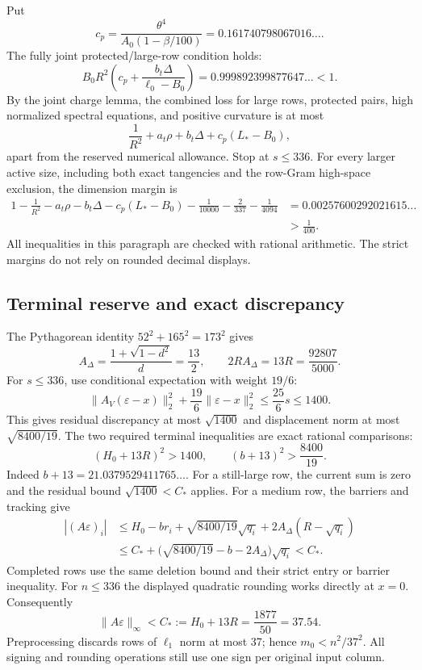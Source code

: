 \documentclass[11pt]{amsart}
\theoremstyle{remark}\newtheorem{remark}[theorem]{Remark}
\begin{document}
Put
\[
 c_p=\frac{\theta^4}{A_0(1-\beta/100)}
     =0.161740798067016\ldots.
\]
The fully joint protected/large-row condition holds:
\[
 B_0R^2\left(c_p+\frac{b_t\Delta}{\ell_0-B_0}\right)
 =0.999892399877647\ldots<1.
\]
By the joint charge lemma, the combined loss for large rows, protected
pairs, high normalized spectral equations, and positive curvature is at
most
\[
 \frac1{R^2}+a_t\rho+b_t\Delta+c_p(L_*-B_0),
\]
apart from the reserved numerical allowance.  Stop at $s\le336$.
For every larger active size, including both exact tangencies and the
row-Gram high-space exclusion, the dimension margin is
\begin{align*}
 1-\frac1{R^2}-a_t\rho-b_t\Delta-c_p(L_*-B_0)
 -\frac1{10000}-\frac2{337}-\frac1{4094}
 &=0.00257600292021615\ldots\\
 &>\frac1{400}.
\end{align*}
All inequalities in this paragraph are checked with rational arithmetic.
The strict margins do not rely on rounded decimal displays.

\subsection{Terminal reserve and exact discrepancy}
The Pythagorean identity $52^2+165^2=173^2$ gives
\[
 A_\Delta=\frac{1+\sqrt{1-d^2}}d=\frac{13}{2},\qquad
 2RA_\Delta=13R=\frac{92807}{5000}.
\]
For $s\le336$, use conditional expectation with weight $19/6$:
\[
 \|A_V(\varepsilon-x)\|_2^2
 +\frac{19}{6}\|\varepsilon-x\|_2^2
 \le\frac{25}{6}s\le1400.
\]
This gives residual discrepancy at most $\sqrt{1400}$ and displacement
norm at most $\sqrt{8400/19}$.  The two required terminal inequalities are
exact rational comparisons:
\[
 \left(H_0+13R\right)^2>1400,\qquad
 (b+13)^2>\frac{8400}{19}.
\]
Indeed $b+13=21.0379529411765\ldots$.  For a still-large row, the current sum is zero and the residual bound
$\sqrt{1400}<C_*$ applies. For a medium row, the barriers and tracking give
\begin{align*}
 |(A\varepsilon)_i|
 &\le H_0-br_i+\sqrt{8400/19}\sqrt{q_i}
             +2A_\Delta(R-\sqrt{q_i})\\
 &\le C_*+
   \bigl(\sqrt{8400/19}-b-2A_\Delta\bigr)\sqrt{q_i}<C_*.
\end{align*}
Completed rows use the same deletion bound and their strict entry or
barrier inequality. For $n\le336$ the displayed quadratic rounding works
directly at $x=0$. Consequently
\[
 \|A\varepsilon\|_\infty<C_*:=H_0+13R
 =\frac{1877}{50}=37.54.
\]
Preprocessing discards rows of $\ell_1$ norm at most 37; hence
$m_0<n^2/37^2$.  All signing and rounding operations still use one sign
per original input column.
\end{document}
